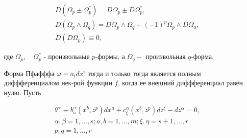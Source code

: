 \documentclass[10pt]{article}
\begin{document}
\[

\begin{gathered}

D\left(\Omega_{p} \pm \Omega_{p}^{*}\right)=D \Omega_{p} \pm D \Omega_{p}^{*}, \\

D\left(\Omega_{p} \wedge \Omega_{q}\right)=D \Omega_{p} \wedge \Omega_{q}+(-1)^{p} \Omega_{p} \wedge D \Omega_{a}, \\

D\left(D \Omega_{p}\right) \equiv 0,

\end{gathered}

\]



где $\Omega_{p}, \quad \Omega_{p}^{*}$ - произвольные $p$-формы, а $\Omega_{q}-$ произвольная $q$-форма.



Форма Пфафффа $\omega=a_{i} d x^{i}$ тогда и только тогда является полным диффференциалом нек-рой функции $f$, когда ее внешний диффференциал равен нулю. Пусть



\[

\begin{gathered}

\theta^{\alpha} \equiv b_{a}^{\alpha}\left(x^{b}, z^{p}\right) d x^{a}+c_{\xi}^{\alpha}\left(x^{b}, z^{p}\right) d z^{\xi}-d z^{\alpha}=0, \\

\alpha, \beta=1, \ldots, s ; a, b=1, \ldots, m ; \xi, \eta=s+1, \ldots, r \\

p, q=1, \ldots, r

\end{gathered}

\]
\end{document}
